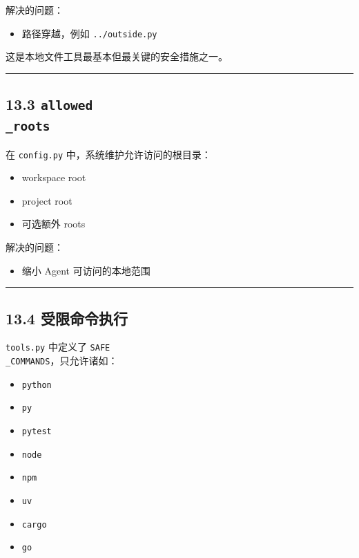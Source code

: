 \documentclass[UTF8,12pt,openany]{ctexbook}
\begin{document}
解决的问题：\par

\begin{itemize}
\item 路径穿越，例如 \texttt{../outside.py}
\end{itemize}

这是本地文件工具最基本但最关键的安全措施之一。\par

\hrule

\subsection{13.3 \texttt{allowed\\_roots}}

在 \texttt{config.py} 中，系统维护允许访问的根目录：\par

\begin{itemize}
\item workspace root
\item project root
\item 可选额外 roots
\end{itemize}

解决的问题：\par

\begin{itemize}
\item 缩小 Agent 可访问的本地范围
\end{itemize}

\hrule

\subsection{13.4 受限命令执行}

\texttt{tools.py} 中定义了 \texttt{SAFE\\_COMMANDS}，只允许诸如：\par

\begin{itemize}
\item \texttt{python}
\item \texttt{py}
\item \texttt{pytest}
\item \texttt{node}
\item \texttt{npm}
\item \texttt{uv}
\item \texttt{cargo}
\item \texttt{go}
\end{itemize}
\end{document}

